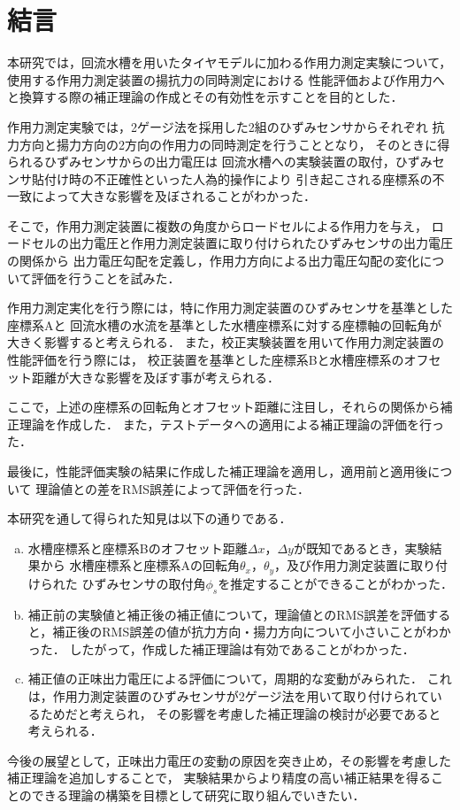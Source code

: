 \section{結言}
本研究では，回流水槽を用いたタイヤモデルに加わる作用力測定実験について，
使用する作用力測定装置の揚抗力の同時測定における
性能評価および作用力へと換算する際の補正理論の作成とその有効性を示すことを目的とした．

作用力測定実験では，2ゲージ法を採用した2組のひずみセンサからそれぞれ
抗力方向と揚力方向の2方向の作用力の同時測定を行うこととなり，
そのときに得られるひずみセンサからの出力電圧は
回流水槽への実験装置の取付，ひずみセンサ貼付け時の不正確性といった人為的操作により
引き起こされる座標系の不一致によって大きな影響を及ぼされることがわかった．

そこで，作用力測定装置に複数の角度からロードセルによる作用力を与え，
ロードセルの出力電圧と作用力測定装置に取り付けられたひずみセンサの出力電圧の関係から
出力電圧勾配を定義し，作用力方向による出力電圧勾配の変化について評価を行うことを試みた．

作用力測定実化を行う際には，特に作用力測定装置のひずみセンサを基準とした座標系Aと
回流水槽の水流を基準とした水槽座標系に対する座標軸の回転角が大きく影響すると考えられる．
また，校正実験装置を用いて作用力測定装置の性能評価を行う際には，
校正装置を基準とした座標系Bと水槽座標系のオフセット距離が大きな影響を及ぼす事が考えられる．

ここで，上述の座標系の回転角とオフセット距離に注目し，それらの関係から補正理論を作成した．
また，テストデータへの適用による補正理論の評価を行った．

最後に，性能評価実験の結果に作成した補正理論を適用し，適用前と適用後について
理論値との差をRMS誤差によって評価を行った．

本研究を通して得られた知見は以下の通りである．

\begin{enumerate}[(a)]
    \item   水槽座標系と座標系Bのオフセット距離$\Delta x$，$\Delta y$が既知であるとき，実験結果から
            水槽座標系と座標系Aの回転角$\theta_x$，$\theta_y$，及び作用力測定装置に取り付けられた
            ひずみセンサの取付角$\phi_s$を推定することができることがわかった．\\
    \item   補正前の実験値と補正後の補正値について，理論値とのRMS誤差を評価すると，補正後のRMS誤差の値が抗力方向・揚力方向について小さいことがわかった．
            したがって，作成した補正理論は有効であることがわかった．\\
    \item   補正値の正味出力電圧による評価について，周期的な変動がみられた．
            これは，作用力測定装置のひずみセンサが2ゲージ法を用いて取り付けられているためだと考えられ，
            その影響を考慮した補正理論の検討が必要であると考えられる．
\end{enumerate}

今後の展望として，正味出力電圧の変動の原因を突き止め，その影響を考慮した補正理論を追加しすることで，
実験結果からより精度の高い補正結果を得ることのできる理論の構築を目標として研究に取り組んでいきたい．
